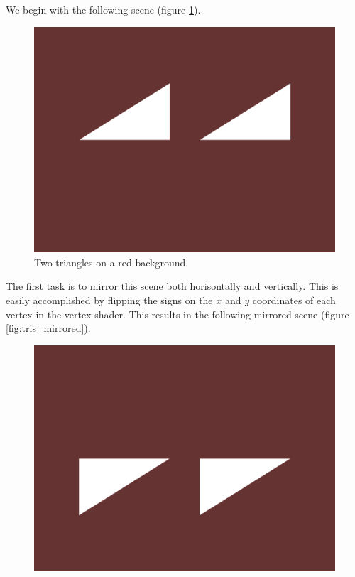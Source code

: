 \documentclass[]{article}
\begin{document}
\begin{multicols}{2}
\subsection{}
We begin with the following scene (figure \ref{fig:tris_red_bg}).
\begin{figure}[H]
\centering
\includegraphics[width=\columnwidth]{tris_red_bg.png}
\caption{Two triangles on a red background.}
\label{fig:tris_red_bg}
\end{figure}
The first task is to mirror this scene both horisontally and vertically. This is easily accomplished by flipping the signs on the $x$ and $y$ coordinates of each vertex in the vertex shader. This results in the following mirrored scene (figure \ref{fig:tris_mirrored}).
\begin{figure}[H]
\centering
\includegraphics[width=\columnwidth]{mirrored-tris.png}

\end{figure}
\end{multicols}
\end{document}
